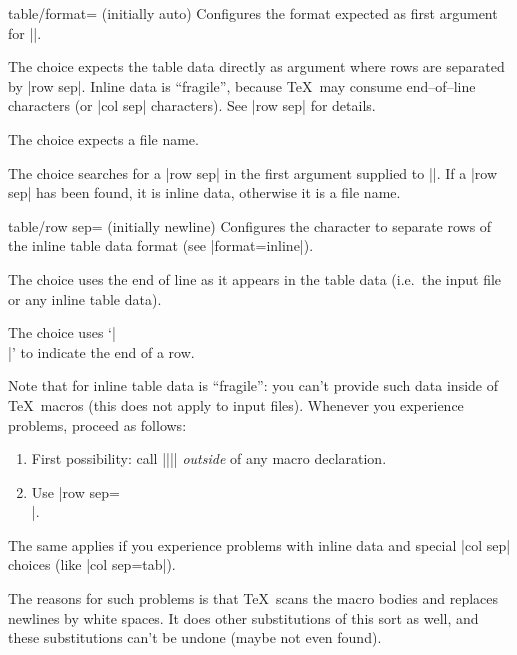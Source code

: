 \begin{pgfplotskey}{table/format= (initially auto)}
	Configures the format expected as first argument for |\pgfplotstableread|.
	
	The choice  expects the table data directly as argument where rows are separated by |row sep|. Inline data is ``fragile'', because \TeX\ may consume end--of--line characters (or |col sep| characters). See |row sep| for details.

	The choice  expects a file name.

	The choice  searches for a |row sep| in the first argument supplied to |\pgfplotstableread|. If a |row sep| has been found, it is inline data, otherwise it is a file name.
\end{pgfplotskey}
\begin{pgfplotskey}{table/row sep= (initially newline)}
	Configures the character to separate rows of the inline table data format (see |format=inline|).

	The choice  uses the end of line as it appears in the table data (i.e.\ the input file or any inline table data).

	The choice \declaretext{\string\\} uses `|\\|' to indicate the end of a row.

	Note that  for inline table data is ``fragile'': you can't provide such data inside of \TeX\ macros (this does not apply to input files). Whenever you experience problems, proceed as follows:
	\begin{enumerate}
		\item First possibility: call |\pgfplotstableread||\yourmacro| \emph{outside} of any macro declaration.
		\item Use |row sep=\\|.
	\end{enumerate}
	The same applies if you experience problems with inline data and special |col sep| choices (like |col sep=tab|).

	The reasons for such problems is that \TeX\ scans the macro bodies and replaces newlines by white spaces. It does other substitutions of this sort as well, and these substitutions can't be undone (maybe not even found).
\end{pgfplotskey}

